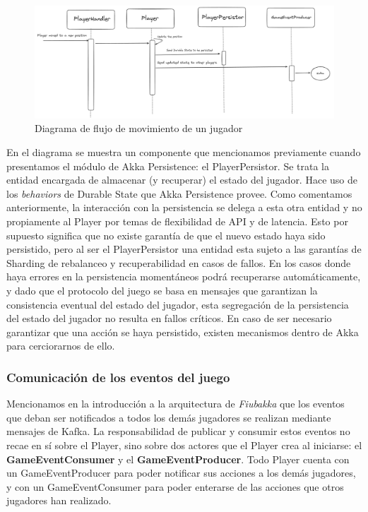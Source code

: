 \begin{figure}[htbp]
    \centering
    \includegraphics[width=1\textwidth]{../assets/player-movement-example.png}
    \caption{Diagrama de flujo de movimiento de un jugador}
\end{figure}

En el diagrama se muestra un componente que mencionamos previamente cuando presentamos el módulo de Akka Persistence: el PlayerPersistor. Se trata la entidad encargada de almacenar (y recuperar) el estado
del jugador. Hace uso de los \textit{behaviors} de Durable State que Akka Persistence provee. Como comentamos anteriormente, la interacción con la persistencia se delega a esta otra entidad y no propiamente al
Player por temas de flexibilidad de API y de latencia. Esto por supuesto significa que no existe garantía de que el nuevo estado haya sido persistido, pero al ser el PlayerPersistor una entidad esta sujeto a las garantías
de Sharding de rebalanceo y recuperabilidad en casos de fallos. En los casos donde haya errores en la persistencia momentáneos podrá recuperarse automáticamente, y dado que el protocolo del juego se basa en mensajes
que garantizan la consistencia eventual del estado del jugador, esta segregación de la persistencia del estado del jugador no resulta en fallos críticos. En caso de ser necesario garantizar que una acción se haya persistido,
existen mecanismos dentro de Akka para cerciorarnos de ello.

\subsubsection{Comunicación de los eventos del juego}

\noindent Mencionamos en la introducción a la arquitectura de \textit{Fiubakka} que los eventos que deban ser notificados a todos los demás jugadores se realizan mediante mensajes de Kafka.
La responsabilidad de publicar y consumir estos eventos no recae en sí sobre el Player, sino sobre dos actores que el Player crea al iniciarse: el \textbf{GameEventConsumer} y el \textbf{GameEventProducer}.
Todo Player cuenta con un GameEventProducer para poder notificar sus acciones a los demás jugadores, y con un GameEventConsumer para poder enterarse de las acciones que otros jugadores han realizado.

